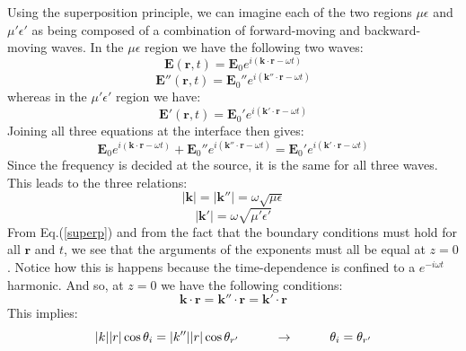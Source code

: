 \documentclass[preprint, onecolumn, amsmath, amssymb, aps]{revtex4-1}
\numberwithin{equation}{section}
\begin{document}
Using the superposition principle, we can imagine each of the two regions $\mu \epsilon$ and $\mu' \epsilon'$ as being composed of a combination of forward-moving and backward-moving waves. In the $\mu \epsilon$ region we have the following two waves:
\begin{equation}
\mathbf{E}(\mathbf{r}, t) = \mathbf{E}_{0} e^{i (\mathbf{k} \cdot \mathbf{r} - \omega t)}
\end{equation}
\begin{equation}
\mathbf{E}''(\mathbf{r}, t) = \mathbf{E}_{0}'' e^{i (\mathbf{k}'' \cdot \mathbf{r} - \omega t)}
\end{equation}
\noindent
whereas in the $\mu' \epsilon'$ region we have:
\begin{equation}
\mathbf{E}'(\mathbf{r}, t) = \mathbf{E}_{0}' e^{i (\mathbf{k}' \cdot \mathbf{r} - \omega t)}
\end{equation}
\noindent
Joining all three equations at the interface then gives:
\begin{equation}\label{superp}
\mathbf{E}_{0} e^{i (\mathbf{k} \cdot \mathbf{r} - \omega t)} + \mathbf{E}_{0}'' e^{i (\mathbf{k}'' \cdot \mathbf{r} - \omega t)} = \mathbf{E}_{0}' e^{i (\mathbf{k}' \cdot \mathbf{r} - \omega t)}
\end{equation}
\noindent
Since the frequency is decided at the source, it is the same for all three waves. This leads to the three relations:
\begin{equation}\label{k1}
|\mathbf{k}| = |\mathbf{k}''| = \omega \sqrt{\mu \epsilon}
\end{equation}
\begin{equation}\label{k2}
|\mathbf{k}'| = \omega \sqrt{\mu' \epsilon'}
\end{equation}
\noindent
From Eq.(\ref{superp}) and from the fact that the boundary conditions must hold for all $\mathbf{r}$ and $t$, we see that the arguments of the exponents must all be equal at $z = 0$. Notice how this is happens because the time-dependence is confined to a $e^{-i \omega t}$ harmonic. And so, at $z = 0$ we have the following conditions:
\begin{equation}
\mathbf{k} \cdot \mathbf{r} =  \mathbf{k}'' \cdot \mathbf{r} = \mathbf{k}' \cdot \mathbf{r}
\end{equation}
\noindent
This implies:
\begin{equation}
|k||r| \cos \theta_{i} = |k''||r| \cos \theta_{r'} \hspace{10mm} \rightarrow \hspace{10mm}\theta_{i} = \theta_{r'}
\end{equation}
\end{document}
